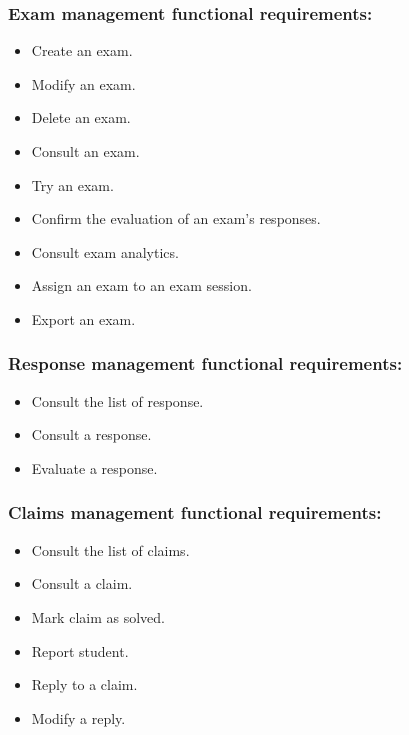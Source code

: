 \documentclass[a4paper,12p]{article}
\begin{document}
        \subsubsection{Exam management functional requirements:}
        \begin{itemize}
            \item Create an exam.
            \item Modify an exam.
            \item Delete an exam.
            \item Consult an exam.
            \item Try an exam.
            \item Confirm the evaluation of an exam's responses.
            \item Consult exam analytics.
            \item Assign an exam to an exam session.
            \item Export an exam.
        \end{itemize}

        \subsubsection{Response management functional requirements:}
        \begin{itemize}
            \item Consult the list of response.
            \item Consult a response.
            \item Evaluate a response.
        \end{itemize}

        \subsubsection{Claims management functional requirements:}
        \begin{itemize}
            \item Consult the list of claims.
            \item Consult a claim.
            \item Mark claim as solved.
            \item Report student.
            \item Reply to a claim.
            \item Modify a reply.
        \end{itemize}
\end{document}
